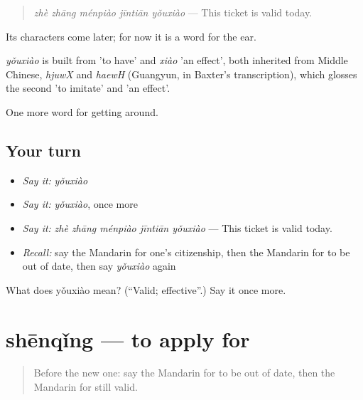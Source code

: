 \begin{quote}
\emph{zhè zhāng ménpiào jīntiān yǒuxiào} — This ticket is valid today.
\end{quote}

Its characters come later; for now it is a word for the ear.

\begin{cousinweb}
\emph{yǒuxiào} is built from  'to have' and \emph{xiào} 'an effect', both inherited from Middle Chinese, \emph{hjuwX} and \emph{haewH} (Guangyun, in Baxter's transcription), which glosses the second 'to imitate' and 'an effect'.
\end{cousinweb}

\begin{grammarlens}[title={What you've built}]
One more word for getting around.
\end{grammarlens}

\subsection*{Your turn}
\begin{itemize}
\raggedright
  \item \emph{Say it:} \emph{yǒuxiào}
  \item \emph{Say it:} \emph{yǒuxiào}, once more
  \item \emph{Say it:} \emph{zhè zhāng ménpiào jīntiān yǒuxiào} — This ticket is valid today.
  \item \emph{Recall:} say the Mandarin for one's citizenship, then the Mandarin for to be out of date, then say \emph{yǒuxiào} again
\end{itemize}

\begin{tcolorbox}[breakable,colback=teal!4,colframe=teal!35!black,title={Before you move on}]
What does yǒuxiào mean? (\textquotedblleft{}Valid; effective\textquotedblright{}.) Say it once more.
\end{tcolorbox}
\section[shēnqǐng]{shēnqǐng — to apply for}

\label{lesson:ZH-C455-shenqing}



\begin{quote}
Before the new one: say the Mandarin for to be out of date, then the Mandarin for still valid.
\end{quote}


